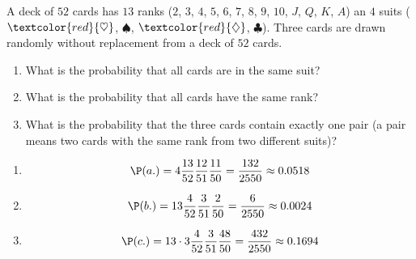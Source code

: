 
\begin{exercise}

A deck of $52$ cards has $13$ ranks ($2$, $3$, $4$, $5$, $6$, $7$, $8$, $9$, $10$, $J$, $Q$, $K$, $A$) an $4$ suits ($\textcolor{red}{\heartsuit}$, $\spadesuit$, $\textcolor{red}{\diamondsuit}$, $\clubsuit$).
Three cards are drawn randomly without replacement from a deck of $52$ cards.

\begin{enumerate}[label = (\alph*)]
    \item What is the probability that all cards are in the same suit?
    \item What is the probability that all cards have the same rank?
    \item What is the probability that the three cards contain exactly one pair (a pair means two cards with the same rank from two different suits)?
\end{enumerate}

\end{exercise}

\begin{solution}

\phantom{}

\begin{enumerate}[label = (\alph*)]
    \item
    \begin{align*}
      \P(a.) = 4\frac{13}{52}\frac{12}{51}\frac{11}{50} = \frac{132}{2550} \approx 0.0518
    \end{align*}
    \item
    \begin{align*}
      \P(b.) = 13\frac{4}{52}\frac{3}{51}\frac{2}{50} = \frac{6}{2550} \approx 0.0024
    \end{align*}
    \item
    \begin{align*}
      \P(c.) = 13\cdot3\frac{4}{52}\frac{3}{51}\frac{48}{50} = \frac{432}{2550} \approx 0.1694
    \end{align*}
\end{enumerate}

\end{solution}

